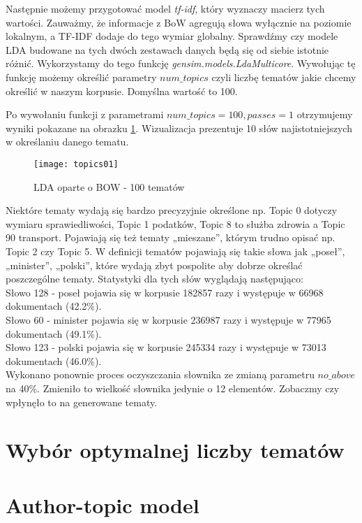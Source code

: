 \documentclass[a4paper,11pt,twoside]{report}
\theoremstyle{definition}
\begin{document}
Następnie możemy przygotować model \textit{tf-idf}, który wyznaczy macierz tych wartości. Zauważmy, że informacje z BoW agregują słowa wyłącznie na poziomie lokalnym, a TF-IDF dodaje do tego wymiar globalny. Sprawdźmy czy modele LDA budowane na tych dwóch zestawach danych będą się od siebie istotnie różnić. Wykorzystamy do tego funkcję \textit{gensim.models.LdaMulticore}. Wywołując tę funkcję możemy określić parametry $num\_topics$ czyli liczbę tematów jakie chcemy określić w naszym korpusie. Domyślna wartość to 100.

Po wywołaniu funkcji z parametrami $ num\_topics=100, passes=1$ otrzymujemy wyniki pokazane na obrazku \ref{tm01}. Wizualizacja prezentuje 10 słów najistotniejszych w określaniu danego tematu. 

\begin{figure}[h] 
\texttt{[image: topics01]} 
\centering \label{tm01} \caption{LDA oparte o BOW - 100 tematów}
\end{figure}
Niektóre tematy wydają się bardzo precyzyjnie określone np. Topic 0 dotyczy wymiaru sprawiedliwości, Topic 1 podatków, Topic 8 to służba zdrowia a Topic 90 transport. Pojawiają się też tematy „mieszane”, którym trudno opisać np. Topic 2 czy Topic 5. W definicji tematów pojawiają się takie słowa jak „poseł”, „minister”, „polski”, które wydają zbyt pospolite aby dobrze określać poszczególne tematy. Statystyki dla tych słów wyglądają następująco:\\
Słowo 128 - poseł pojawia się w korpusie 182857 razy i występuje w 66968 dokumentach (42.2\%).\\
Słowo 60 - minister pojawia się w korpusie 236987 razy i występuje w 77965 dokumentach (49.1\%).\\
Słowo 123 - polski pojawia się w korpusie 245334 razy i występuje w 73013 dokumentach (46.0\%).\\

Wykonano ponownie proces oczyszczania słownika ze zmianą parametru $no\_above$ na 40\%. Zmieniło to wielkość słownika jedynie o 12 elementów. Zobaczmy czy wpłynęło to na generowane tematy.




\section{Wybór optymalnej liczby tematów}
\section{Author-topic model}
\end{document}
